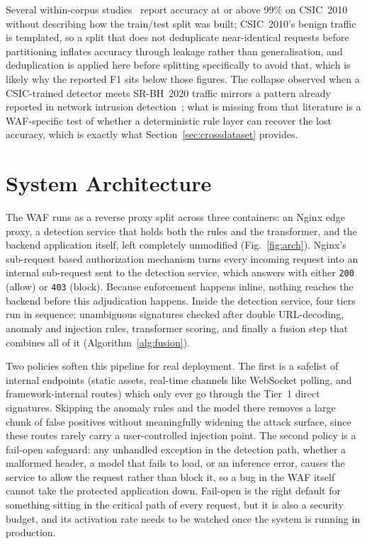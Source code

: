 \documentclass[conference]{IEEEtran}
\begin{document}
Several within-corpus
studies~\cite{scireports2024novelxsssqli,liu2024bertlstm} report accuracy
at or above $99\%$ on CSIC~2010 without describing how the train/test
split was built; CSIC~2010's benign traffic is templated, so a split that
does not deduplicate near-identical requests before partitioning inflates
accuracy through leakage rather than generalisation, and deduplication is
applied here before splitting specifically to avoid that, which is likely
why the reported F1 sits below those figures. The collapse observed when a
CSIC-trained detector meets SR-BH~2020 traffic mirrors a pattern already
reported in network intrusion
detection~\cite{cantone2024crossdataset,venkatesan2026crossdataset}; what is
missing from that literature is a WAF-specific test of whether a
deterministic rule layer can recover the lost accuracy, which is exactly
what Section~\ref{sec:crossdataset} provides.

\section{System Architecture}
The WAF runs as a reverse proxy split across three containers: an Nginx edge
proxy, a detection service that holds both the rules and the transformer,
and the backend application itself, left completely unmodified
(Fig.~\ref{fig:arch}). Nginx's sub-request based authorization mechanism
turns every incoming request into an internal sub-request sent to the
detection service, which answers with either \texttt{200} (allow) or \texttt{403}
(block). Because enforcement happens inline, nothing reaches the backend
before this adjudication happens. Inside the detection service, four tiers
run in sequence: unambiguous signatures checked after double URL-decoding,
anomaly and injection rules, transformer scoring, and finally a fusion step
that combines all of it (Algorithm~\ref{alg:fusion}).

Two policies soften this pipeline for real deployment. The first is a
safelist of internal endpoints (static assets, real-time channels like
WebSocket polling, and framework-internal routes) which only ever go
through the Tier~1 direct signatures. Skipping the anomaly rules and the
model there removes a large chunk of false positives without meaningfully
widening the attack surface, since these routes rarely carry a
user-controlled injection point. The second
policy is a fail-open safeguard: any unhandled exception in the detection
path, whether a malformed header, a model that fails to load, or an
inference error, causes the service to allow the request rather than
block it, so a bug in the WAF itself cannot take the protected
application down. Fail-open is the right default for something sitting
in the critical path of every request, but it is also a security budget,
and its activation rate needs to be watched once the system is running
in production.
\end{document}
